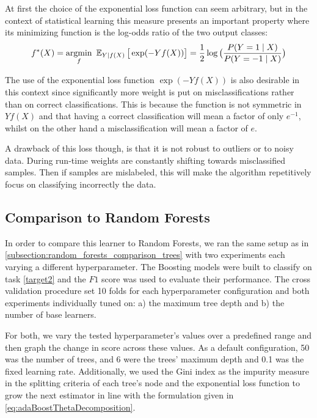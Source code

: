 At first the choice of the exponential loss function can seem arbitrary, but in the context of statistical learning this measure presents an important property where its minimizing function is the log-odds ratio of the two output classes:
\begin{equation}
f^*(X) = \underset{f}{\mathrm{argmin}} \ \Expect_{Y | f(X)}\big[ \exp(-Yf(X)) \big] = \frac{1}{2}\log\big( \frac{ P(Y=1 \mid X) }{ P(Y=-1 \mid X) } \big)
\end{equation}


The use of the exponential loss function $\exp(-Yf(X))$ is also desirable in this context since significantly more weight is put on misclassifications rather than on correct classifications. 
This is because the function is not symmetric in $Yf(X)$ and that having a correct classification will mean a factor of only $e^{-1}$, whilst on the other hand a misclassification will mean a factor of $e$.

A drawback of this loss though, is that it is not robust to outliers or to noisy data. 
During run-time weights are constantly shifting towards misclassified samples. 
Then if samples are mislabeled, this will make the algorithm repetitively focus on classifying incorrectly the data.


\subsection{ Comparison to Random Forests}\label{subsection:boosting_comparison_forest}

In order to compare this learner to Random Forests, we ran the same setup as in \cref{subsection:random_forests_comparison_trees}
with two experiments each varying a different hyperparameter.
The Boosting models were built to classify on task \cref{target2} and the $F1$ score was used to evaluate their performance.
The cross validation procedure set 10 folds for each hyperparameter
 configuration and both experiments individually tuned on: a) the maximum tree depth and b) the number of base learners.

For both, we vary the tested hyperparameter's values over a predefined range and then graph the change in score across these values.
As a default configuration, 50 was the number of trees, and 6 were the trees' maximum depth and 0.1 was the fixed learning rate.
Additionally, we used the Gini index as the impurity measure in the splitting criteria of each tree's node and the exponential loss function to grow the next estimator in line with the formulation given in \cref{eq:adaBoostThetaDecomposition}.

